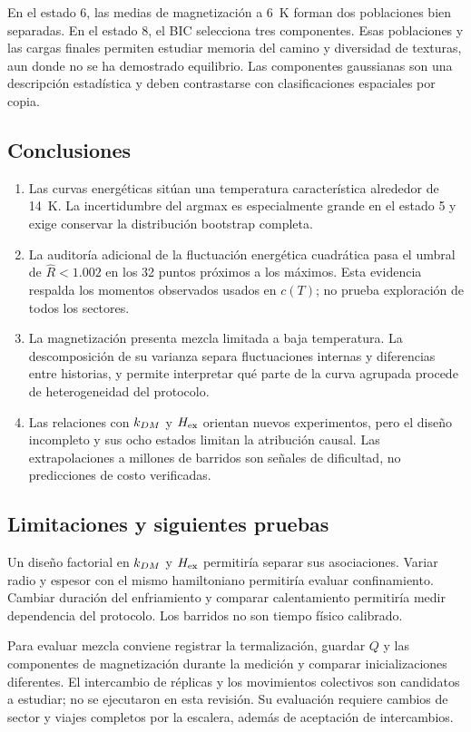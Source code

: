 En el estado 6, las medias de magnetización a 6~K forman dos poblaciones bien separadas. En el estado 8, el BIC selecciona tres componentes. Esas poblaciones y las cargas finales permiten estudiar memoria del camino y diversidad de texturas, aun donde no se ha demostrado equilibrio. Las componentes gaussianas son una descripción estadística y deben contrastarse con clasificaciones espaciales por copia.

\subsection{Conclusiones}

\begin{enumerate}
\item Las curvas energéticas sitúan una temperatura característica alrededor de 14~K. La incertidumbre del argmax es especialmente grande en el estado 5 y exige conservar la distribución bootstrap completa.
\item La auditoría adicional de la fluctuación energética cuadrática pasa el umbral de $\hat R<1.002$ en los 32 puntos próximos a los máximos. Esta evidencia respalda los momentos observados usados en $c(T)$; no prueba exploración de todos los sectores.
\item La magnetización presenta mezcla limitada a baja temperatura. La descomposición de su varianza separa fluctuaciones internas y diferencias entre historias, y permite interpretar qué parte de la curva agrupada procede de heterogeneidad del protocolo.
\item Las relaciones con $k_{DM}$ y $H_{\mathrm{ex}}$ orientan nuevos experimentos, pero el diseño incompleto y sus ocho estados limitan la atribución causal. Las extrapolaciones a millones de barridos son señales de dificultad, no predicciones de costo verificadas.
\end{enumerate}

\subsection{Limitaciones y siguientes pruebas}

Un diseño factorial en $k_{DM}$ y $H_{\mathrm{ex}}$ permitiría separar sus asociaciones. Variar radio y espesor con el mismo hamiltoniano permitiría evaluar confinamiento. Cambiar duración del enfriamiento y comparar calentamiento permitiría medir dependencia del protocolo. Los barridos no son tiempo físico calibrado.

Para evaluar mezcla conviene registrar la termalización, guardar $Q$ y las componentes de magnetización durante la medición y comparar inicializaciones diferentes. El intercambio de réplicas y los movimientos colectivos son candidatos a estudiar; no se ejecutaron en esta revisión. Su evaluación requiere cambios de sector y viajes completos por la escalera, además de aceptación de intercambios.

